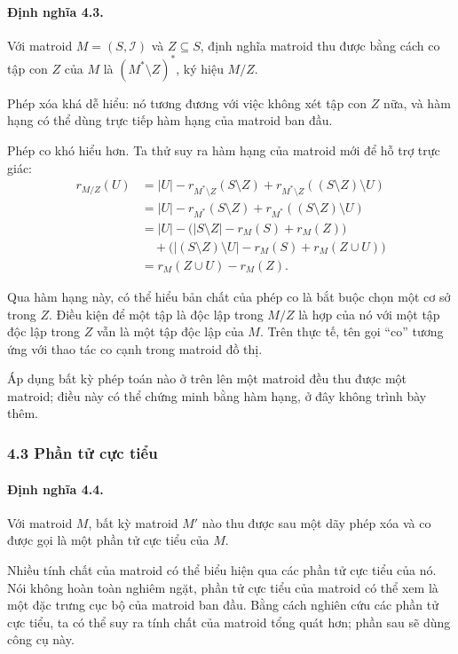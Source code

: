 \documentclass[11pt]{article}
\begin{document}
\paragraph{Định nghĩa 4.3.}
Với matroid \(M=(S,\mathcal I)\) và \(Z\subseteq S\), định nghĩa matroid thu
được bằng cách co tập con \(Z\) của \(M\) là \((M^*\setminus Z)^*\), ký hiệu
\(M/Z\).

Phép xóa khá dễ hiểu: nó tương đương với việc không xét tập con \(Z\) nữa, và
hàm hạng có thể dùng trực tiếp hàm hạng của matroid ban đầu.

Phép co khó hiểu hơn. Ta thử suy ra hàm hạng của matroid mới để hỗ trợ trực
giác:
\[
\begin{aligned}
r_{M/Z}(U)
  &= |U|-r_{M^*\setminus Z}(S\setminus Z)
     +r_{M^*\setminus Z}((S\setminus Z)\setminus U)\\
  &= |U|-r_{M^*}(S\setminus Z)+r_{M^*}((S\setminus Z)\setminus U)\\
  &= |U|-\bigl(|S\setminus Z|-r_M(S)+r_M(Z)\bigr)\\
  &\quad +\bigl(|(S\setminus Z)\setminus U|-r_M(S)+r_M(Z\cup U)\bigr)\\
  &= r_M(Z\cup U)-r_M(Z).
\end{aligned}
\]

Qua hàm hạng này, có thể hiểu bản chất của phép co là bắt buộc chọn một cơ sở
trong \(Z\). Điều kiện để một tập là độc lập trong \(M/Z\) là hợp của nó với một
tập độc lập trong \(Z\) vẫn là một tập độc lập của \(M\). Trên thực tế, tên gọi
``co'' tương ứng với thao tác co cạnh trong matroid đồ thị.

Áp dụng bất kỳ phép toán nào ở trên lên một matroid đều thu được một matroid;
điều này có thể chứng minh bằng hàm hạng, ở đây không trình bày thêm.

\subsubsection*{4.3 Phần tử cực tiểu}

\paragraph{Định nghĩa 4.4.}
Với matroid \(M\), bất kỳ matroid \(M'\) nào thu được sau một dãy phép xóa và
co được gọi là một phần tử cực tiểu của \(M\).

Nhiều tính chất của matroid có thể biểu hiện qua các phần tử cực tiểu của nó.
Nói không hoàn toàn nghiêm ngặt, phần tử cực tiểu của matroid có thể xem là một
đặc trưng cục bộ của matroid ban đầu. Bằng cách nghiên cứu các phần tử cực tiểu,
ta có thể suy ra tính chất của matroid tổng quát hơn; phần sau sẽ dùng công cụ
này.
\end{document}
